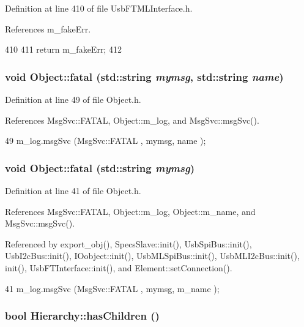 Definition at line 410 of file UsbFTMLInterface.h.

References m\_\-fakeErr.


\begin{DoxyCode}
410                           {
411     return m_fakeErr;
412   }
\end{DoxyCode}
\hypertarget{classObject_ae62acd3d09f716220f75f252dc38bc9a}{
\subsubsection[{fatal}]{\setlength{\rightskip}{0pt plus 5cm}void Object::fatal (std::string {\em mymsg}, \/  std::string {\em name})}}
\label{classObject_ae62acd3d09f716220f75f252dc38bc9a}


Definition at line 49 of file Object.h.

References MsgSvc::FATAL, Object::m\_\-log, and MsgSvc::msgSvc().


\begin{DoxyCode}
49 { m_log.msgSvc (MsgSvc::FATAL   , mymsg, name ); }
\end{DoxyCode}
\hypertarget{classObject_aad5a16aac7516ce65bd5ec02ab07fc80}{
\subsubsection[{fatal}]{\setlength{\rightskip}{0pt plus 5cm}void Object::fatal (std::string {\em mymsg})}}
\label{classObject_aad5a16aac7516ce65bd5ec02ab07fc80}


Definition at line 41 of file Object.h.

References MsgSvc::FATAL, Object::m\_\-log, Object::m\_\-name, and MsgSvc::msgSvc().

Referenced by export\_\-obj(), SpecsSlave::init(), UsbSpiBus::init(), UsbI2cBus::init(), IOobject::init(), UsbMLSpiBus::init(), UsbMLI2cBus::init(), init(), UsbFTInterface::init(), and Element::setConnection().


\begin{DoxyCode}
41 { m_log.msgSvc (MsgSvc::FATAL   , mymsg, m_name ); }
\end{DoxyCode}
\hypertarget{classHierarchy_a255174fe4d316d2a3f430dcb9dab29f1}{
\subsubsection[{hasChildren}]{\setlength{\rightskip}{0pt plus 5cm}bool Hierarchy::hasChildren ()}}
\label{classHierarchy_a255174fe4d316d2a3f430dcb9dab29f1}


